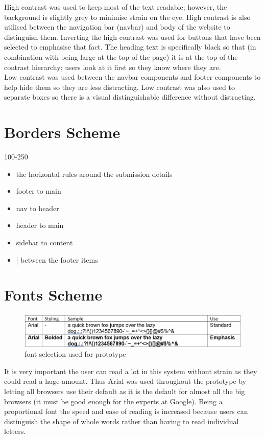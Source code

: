 \documentclass[10pt,a4paper]{article}
\begin{document}
	High contrast was used to keep most of the text readable; however, the background is slightly grey to minimise strain on the eye. High contrast is also utilised between the navigation bar (navbar) and body of the website to distinguish them. Inverting the high contrast was used for buttons that have been selected to emphasise that fact.  The heading text is specifically black so that (in combination with being large at the top of the page) it is at the top of the contrast hierarchy; users look at it first so they know where they are.\\	
	
	Low contrast was used between the navbar components and footer components to help hide them so they are less distracting. Low contrast was also used to separate boxes so there is a visual distinguishable difference without distracting.
	
	
\section{Borders Scheme}
	100-250
	\begin{itemize}
		\item the horizontal rules around the submission details
		\item footer to main
		\item nav to header
		\item header to main
		\item sidebar to content
		\item | between the footer items
	\end{itemize}
	
	
\section{Fonts Scheme}
	\begin{figure}[H]
		\centering
		\includegraphics[width=\textwidth]{Fonts.PNG}
		\caption{font selection used for prototype}
		\label{fig:color}
	\end{figure}
		It is very important the user can read a lot in this system without strain as they could read a huge amount. Thus Arial was used throughout the prototype by letting all browsers use their default as it is the default for almost all the big browsers (it must be good enough for the experts at Google). Being a proportional font the speed and ease of reading is increased because users can distinguish the shape of whole words rather than having to read individual letters.\\
	
\end{document}
